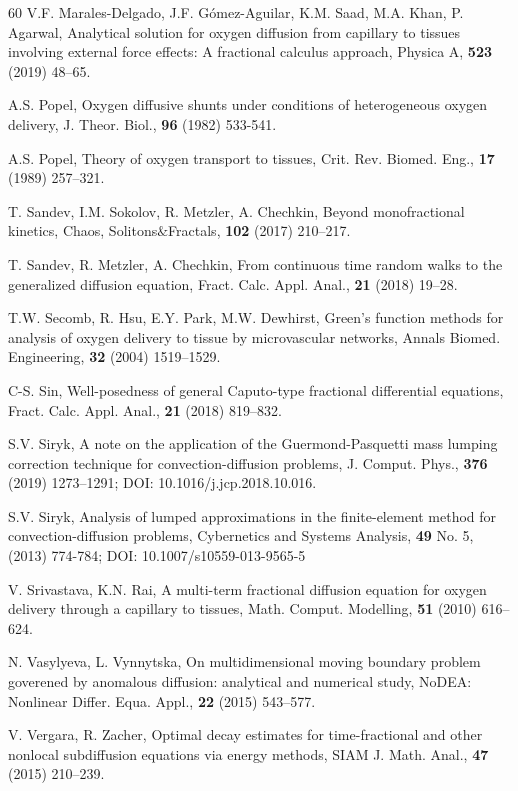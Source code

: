 \documentclass[reqno]{amsart}
\theoremstyle{definition}
\numberwithin{equation}{section}
\begin{document}
\begin{thebibliography}{60}
V.F. Marales-Delgado, J.F. G\'{o}mez-Aguilar, K.M. Saad, M.A. Khan, P. Agarwal, Analytical solution for oxygen diffusion from capillary to tissues involving external force effects: A fractional calculus approach, Physica A, \textbf{523} (2019) 48--65.

A.S. Popel, Oxygen diffusive shunts under conditions of heterogeneous oxygen delivery, J. Theor. Biol., \textbf{96} (1982) 533-541.

A.S. Popel, Theory of oxygen transport to tissues, Crit. Rev. Biomed. Eng., \textbf{17} (1989) 257--321.

T. Sandev, I.M. Sokolov, R. Metzler, A. Chechkin, Beyond monofractional kinetics, Chaos, Solitons$\&$Fractals, \textbf{102} (2017) 210--217.

T. Sandev,  R. Metzler, A. Chechkin, From continuous time random walks to the generalized diffusion equation, Fract. Calc. Appl. Anal., \textbf{21} (2018) 19--28.

T.W. Secomb, R. Hsu, E.Y. Park, M.W. Dewhirst, Green’s function methods for analysis of oxygen delivery
to tissue by microvascular networks, Annals Biomed. Engineering, \textbf{32} (2004) 1519--1529.

C-S. Sin, Well-posedness of general Caputo-type fractional differential equations, Fract. Calc. Appl. Anal., \textbf{21}  (2018) 819--832.

S.V. Siryk, A note on the application of the Guermond-Pasquetti mass lumping correction technique for convection-diffusion problems, J. Comput.  Phys., \textbf{376} (2019) 1273--1291; DOI: 10.1016/j.jcp.2018.10.016.

S.V. Siryk, Analysis of lumped approximations in the finite-element method for convection-diffusion problems, Cybernetics and Systems Analysis, \textbf{49} No. 5, (2013) 774-784; DOI: 10.1007/s10559-013-9565-5

V. Srivastava, K.N. Rai, A multi-term fractional diffusion equation for oxygen delivery through a capillary to tissues, Math. Comput. Modelling, \textbf{51} (2010) 616--624.

N. Vasylyeva, L. Vynnytska, On multidimensional moving boundary problem goverened by anomalous diffusion: analytical and numerical study, NoDEA: Nonlinear Differ. Equa. Appl., \textbf{22} (2015) 543--577.

V. Vergara, R. Zacher, Optimal decay estimates for time-fractional and other nonlocal subdiffusion equations via energy methods, SIAM J. Math. Anal., \textbf{47} (2015) 210--239.


\end{thebibliography}
\end{document}
